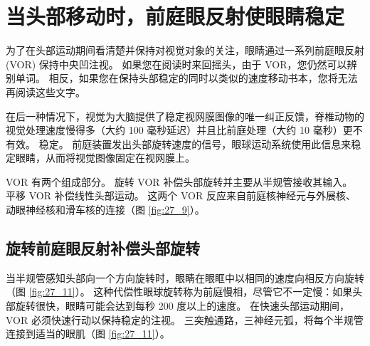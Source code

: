 \section{当头部移动时，前庭眼反射使眼睛稳定}
为了在头部运动期间看清楚并保持对视觉对象的关注，眼睛通过一系列前庭眼反射 (VOR) 保持中央凹注视。 如果您在阅读时来回摇头，由于 VOR，您仍然可以辨别单词。 相反，如果您在保持头部稳定的同时以类似的速度移动书本，您将无法再阅读这些文字。

在后一种情况下，视觉为大脑提供了稳定视网膜图像的唯一纠正反馈，脊椎动物的视觉处理速度慢得多（大约 100 毫秒延迟）并且比前庭处理（大约 10 毫秒）更不有效。 稳定。 前庭装置发出头部旋转速度的信号，眼球运动系统使用此信息来稳定眼睛，从而将视觉图像固定在视网膜上。

VOR 有两个组成部分。 旋转 VOR 补偿头部旋转并主要从半规管接收其输入。 平移 VOR 补偿线性头部运动。 这两个 VOR 反应来自前庭核神经元与外展核、动眼神经核和滑车核的连接（图 \ref{fig:27_9}）。

\subsection{旋转前庭眼反射补偿头部旋转}
当半规管感知头部向一个方向旋转时，眼睛在眼眶中以相同的速度向相反方向旋转（图 \ref{fig:27_11}）。 
这种代偿性眼球旋转称为前庭慢相，尽管它不一定慢：如果头部旋转很快，眼睛可能会达到每秒 200 度以上的速度。 
在快速头部运动期间，VOR 必须快速行动以保持稳定的注视。 
三突触通路，三神经元弧，将每个半规管连接到适当的眼肌（图 \ref{fig:27_11}）。

